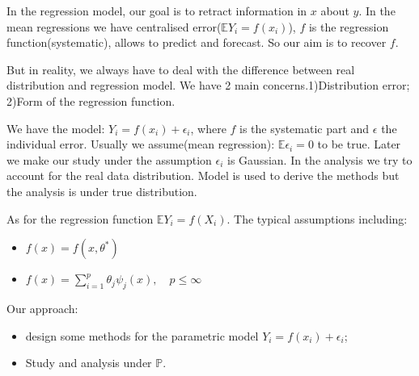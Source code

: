 In the regression model, our goal is to retract information in $x$ about $y$. In the mean regressions we have centralised error($\mathbb{E} Y_i = f(x_i)$), $f$ is the regression function(systematic), allows to predict and forecast. So our aim is to recover $f$.\par 
But in reality, we always have to deal with the difference between real distribution and regression model. We have 2 main concerns.1)Distribution error; 2)Form of the regression function.\par 
We have the model: $Y_i = f(x_i) + \epsilon_i$, where $f$ is the systematic part and $\epsilon$ the individual error. Usually we assume(mean regression): $\mathbb{E} \epsilon_i = 0$ to be true. Later we make our study under the assumption $\epsilon_i$ is Gaussian. In the analysis we try to account for the real data distribution. Model is used to derive the methods but the analysis is under true distribution.\par 
As for the regression function $\mathbb{E} Y_i = f(X_i)$. The typical assumptions including:
\begin{itemize}
	\item $f(x) = f(x, \theta^*)$
	\item $f(x) = \sum_{i = 1}^p \theta_j \psi_j(x), \quad p \leq \infty$
\end{itemize}

Our approach:
\begin{itemize}
	\item design some methods for the parametric model $Y_i = f(x_i) + \epsilon_i$;
	\item Study and analysis under $\mathbb{P}$.
\end{itemize} 





